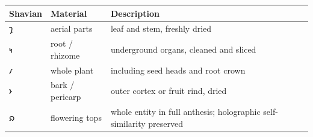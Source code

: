 \documentclass[12pt,a4paper]{article}
\begin{document}
\begin{longtable}[]{@{}lll@{}}
\toprule
\begin{minipage}[b]{0.30\columnwidth}\raggedright
Shavian\strut
\end{minipage} & \begin{minipage}[b]{0.30\columnwidth}\raggedright
Material\strut
\end{minipage} & \begin{minipage}[b]{0.30\columnwidth}\raggedright
Description\strut
\end{minipage}\tabularnewline
\midrule
\endhead
\begin{minipage}[t]{0.30\columnwidth}\raggedright
𐑡\strut
\end{minipage} & \begin{minipage}[t]{0.30\columnwidth}\raggedright
aerial parts\strut
\end{minipage} & \begin{minipage}[t]{0.30\columnwidth}\raggedright
leaf and stem, freshly dried\strut
\end{minipage}\tabularnewline
\begin{minipage}[t]{0.30\columnwidth}\raggedright
𐑰\strut
\end{minipage} & \begin{minipage}[t]{0.30\columnwidth}\raggedright
root / rhizome\strut
\end{minipage} & \begin{minipage}[t]{0.30\columnwidth}\raggedright
underground organs, cleaned and sliced\strut
\end{minipage}\tabularnewline
\begin{minipage}[t]{0.30\columnwidth}\raggedright
𐑥\strut
\end{minipage} & \begin{minipage}[t]{0.30\columnwidth}\raggedright
whole plant\strut
\end{minipage} & \begin{minipage}[t]{0.30\columnwidth}\raggedright
including seed heads and root crown\strut
\end{minipage}\tabularnewline
\begin{minipage}[t]{0.30\columnwidth}\raggedright
𐑶\strut
\end{minipage} & \begin{minipage}[t]{0.30\columnwidth}\raggedright
bark / pericarp\strut
\end{minipage} & \begin{minipage}[t]{0.30\columnwidth}\raggedright
outer cortex or fruit rind, dried\strut
\end{minipage}\tabularnewline
\begin{minipage}[t]{0.30\columnwidth}\raggedright
𐑸\strut
\end{minipage} & \begin{minipage}[t]{0.30\columnwidth}\raggedright
flowering tops\strut
\end{minipage} & \begin{minipage}[t]{0.30\columnwidth}\raggedright
whole entity in full anthesis; holographic self-similarity
preserved\strut
\end{minipage}\tabularnewline
\bottomrule
\end{longtable}
\end{document}
